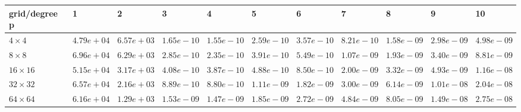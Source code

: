 \begin{tabular}{lllllllllll}
\hline
 grid/degree p   & 1          & 2          & 3          & 4          & 5          & 6          & 7          & 8          & 9          & 10         \\
\hline
 $4 \times 4$    & $4.79e+04$ & $6.57e+03$ & $1.65e-10$ & $1.55e-10$ & $2.59e-10$ & $3.57e-10$ & $8.21e-10$ & $1.58e-09$ & $2.98e-09$ & $4.98e-09$ \\
 $8 \times 8$    & $6.96e+04$ & $6.29e+03$ & $2.85e-10$ & $2.35e-10$ & $3.91e-10$ & $5.49e-10$ & $1.07e-09$ & $1.93e-09$ & $3.40e-09$ & $8.81e-09$ \\
 $16 \times 16$  & $5.15e+04$ & $3.17e+03$ & $4.08e-10$ & $3.87e-10$ & $4.88e-10$ & $8.50e-10$ & $2.00e-09$ & $3.32e-09$ & $4.93e-09$ & $1.16e-08$ \\
 $32 \times 32$  & $6.57e+04$ & $2.16e+03$ & $8.89e-10$ & $8.80e-10$ & $1.11e-09$ & $1.82e-09$ & $3.00e-09$ & $6.14e-09$ & $1.01e-08$ & $2.04e-08$ \\
 $64 \times 64$  & $6.16e+04$ & $1.29e+03$ & $1.53e-09$ & $1.47e-09$ & $1.85e-09$ & $2.72e-09$ & $4.84e-09$ & $8.05e-09$ & $1.49e-08$ & $2.75e-08$ \\
\hline
\end{tabular}